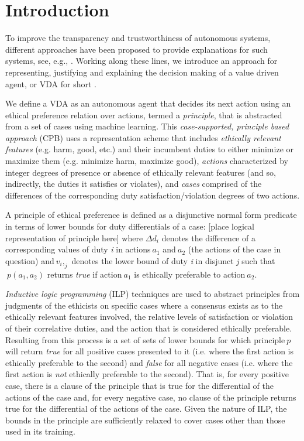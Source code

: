 \documentclass[letterpaper]{article} %
\begin{document}
\section{Introduction}
To improve the transparency and trustworthiness of autonomous systems, different approaches have been proposed to provide explanations for such systems, see, e.g., \cite{Cocarascu2018,DBLP:conf/ijcai/ShihCD18,DBLP:journals/corr/abs-1806-08055}. Working along these lines, we introduce an approach for representing, justifying and explaining the decision making of a value driven agent, or VDA for short \cite{DBLP:conf/aaai/AndersonAB17}.  

We define a VDA as an autonomous agent that decides its next action using an ethical preference relation over actions, termed a \textit{principle}, that is abstracted from a set of cases using machine learning. This \textit{case-supported, principle based approach} (CPB) uses a representation scheme that includes \textit{ethically relevant features} (e.g. harm, good, etc.) and their incumbent duties to either minimize or maximize them (e.g. minimize harm, maximize good), \textit{actions} characterized by integer degrees of presence or absence of ethically relevant features (and so, indirectly, the duties it satisfies or violates), and \textit{cases} comprised of the differences of the corresponding duty satisfaction/violation degrees of two actions.  	

A principle of ethical preference is defined as a disjunctive normal form predicate in terms of lower bounds for duty differentials of a case: 
[place logical representation of principle here]
where $\Delta d_i$ denotes the difference of a corresponding values of duty \textit{i} in actions$\ a_1$ and$\ a_2$ (the actions of the case in question) and$\ v_i,_j$ denotes the lower bound of duty \textit{i} in disjunct \textit{j} such that$\ p(a_1,a_2)$ returns \textit{true} if action$\ a_1$  is ethically preferable to action$\ a_2$.  

\textit{Inductive logic programming} (ILP) techniques are used to abstract principles from judgments of the ethicists on specific cases where a consensus exists as to the ethically relevant features involved, the relative levels of satisfaction or violation of their correlative duties, and the action that is considered ethically preferable.  Resulting from this process is a set of sets of lower bounds for which principle$\ p$ will return \textit{true} for all positive cases presented to it (i.e. where the first action is ethically preferable to the second) and \textit{false} for all negative cases (i.e. where the first action is \textit{not} ethically preferable to the second). That is, for every positive case, there is a clause of the principle that is true for the differential of the actions of the case and, for every negative case, no clause of the principle returns true for the differential of the actions of the case.  Given the nature of ILP, the bounds in the principle are sufficiently relaxed to cover cases other than those used in its training.
\end{document}
